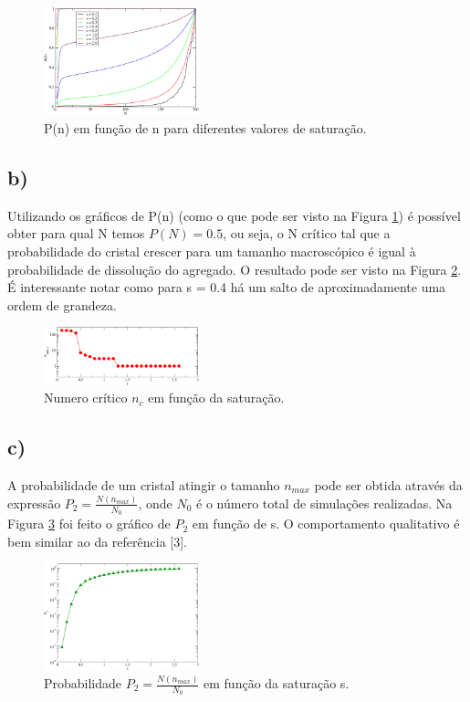 \documentclass[a4wide]{report}
\begin{document}
\begin{figure}[!htb]
\centering
\includegraphics[width=0.4\textwidth]{pn.pdf}
\caption{P(n) em função de n para diferentes valores de saturação.}
\label{2a}
\end{figure}

\subsection*{b)}
Utilizando os gráficos de P(n) (como o que pode ser visto na Figura \ref{2a}) é possível obter para qual N temos $P(N) = 0.5$, ou seja, o N crítico tal que a probabilidade do cristal crescer para um tamanho macroscópico é igual à probabilidade de dissolução do agregado. O resultado pode ser visto na Figura \ref{2b}. É interessante notar como para s = 0.4 há um salto de aproximadamente uma ordem de grandeza.

\begin{figure}[!htb]
\centering
\includegraphics[width=0.4\textwidth]{nc.pdf}
\caption{Numero crítico $n_c$ em função da saturação.}
\label{2b}
\end{figure}


\subsection*{c)}
A probabilidade de um cristal atingir o tamanho $n_{max}$ pode ser obtida através da expressão $P_{2} = \frac{N(n_{max})}{N_0}$, onde $N_0$ é o número total de simulações realizadas. Na Figura \ref{2c} foi feito o gráfico de $P_2$ em função de s. O comportamento qualitativo é bem similar ao da referência [3].

\begin{figure}[!htb]
\centering
\includegraphics[width=0.4\textwidth]{p3.pdf}
\caption{Probabilidade $P_{2} = \frac{N(n_{max})}{N_0}$ em função da saturação s.}
\label{2c}
\end{figure}
\end{document}
